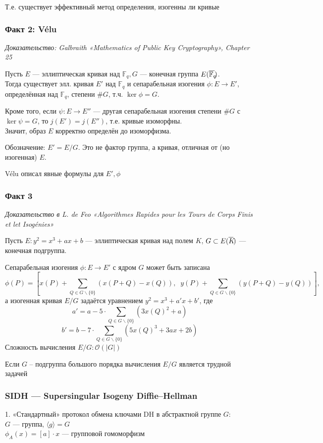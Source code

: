 \documentclass[12pt, final]{article}
\newcommand{\F}{{{\mathbb F}}}
\newcommand{\bigO}{\mathcal{O}}
\newcommand{\overbar}[1]{\overline{\mkern-0.0mu#1\mkern-4.0mu}}
\theoremstyle{definition}
\theoremstyle{definition}
\theoremstyle{definition}
\begin{document}
Т.е. существует эффективный метод определения, изогенны ли кривые

\subsubsection{Факт 2: Vélu}
\textit{Доказательство: Galbraith «Mathematics of Public Key Cryptography», Chapter 25}

Пусть $E$ — эллиптическая кривая над $\F_q, G$ — конечная группа $E(\overbar{\F_q})$.\\
Тогда существует элл. кривая $E'$ над $\F_q$ и сепарабельная изогения $\phi: E \rightarrow E' $, определённая над $\F_q$, степени $\#G$, т.ч. $\ker\phi = G$.

Кроме того, если $\psi: E \rightarrow E''$ — другая сепарабельная изогения степени $\#G$ с $\ker\psi = G$, то $j(E')=j(E'')$, т.е. кривые изоморфны.\\
Значит, образ $E$ корректно определён до изоморфизма.

Обозначение: $E' = E/G$. Это не фактор группа, а кривая, отличная от (но изогенная) $E$.

Vélu описал явные формулы для $E', \phi$

\subsubsection{Факт 3}
\textit{Доказательство в L. de Feo «Algorithmes Rapides pour les Tours de Corps Finis et let Isogénies»}

Пусть $E: y^2 = x^3 + ax + b$ — эллиптическая кривая над полем $K$,\; $G \subset E(\overbar{K})$ — конечная подгруппа.

Сепарабельная изогения $\phi: E \rightarrow E'$ с ядром $G$ может быть записана 
\[
    \phi(P) = [x(P) + \sum_{Q\in G \backslash \{0\}} (x(P+Q) - x(Q)),\;\; y(P) + \sum_{Q\in G \backslash \{0\}}(y(P+Q) - y(Q))],
\]
а изогенная кривая $E/G$ задаётся уравнением $y^2 = x^3 + a'x+b'$, где 
\[
    a' = a - 5\cdot \sum_{Q\in G \backslash \{0\}} (3 x(Q)^2 + a)
\]
\[
    b' = b - 7\cdot \sum_{Q\in G \backslash \{0\}}(5x(Q)^3 + 3ax + 2b)
\]
Сложность вычисления $E/G: \bigO(|G|)$

Если $G$ -- подгруппа большого порядка вычисления $E/G$ является трудной задачей

\subsubsection{SIDH — Supersingular Isogeny Diffie--Hellman}
1. «Стандартный» протокол обмена ключами DH в абстрактной группе $G$: \\ 
$G$ — группа, $\langle g\rangle = G$\\
$\phi_A(x) = [a]\cdot x$ — групповой гомоморфизм
\end{document}
